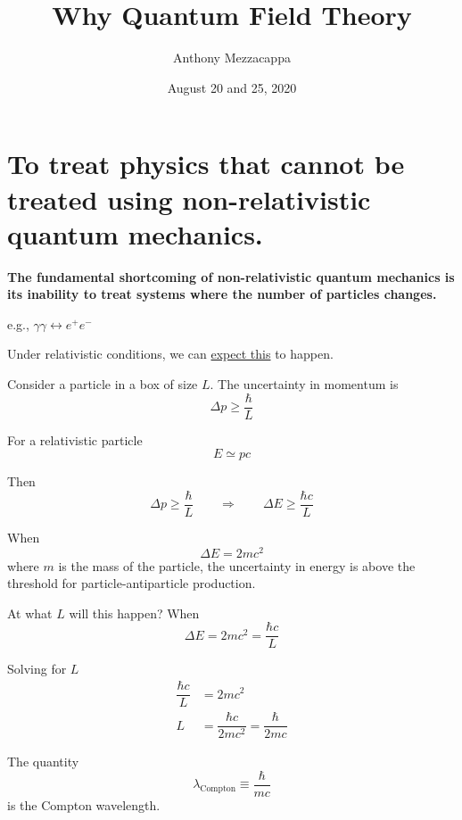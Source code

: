\documentclass{article}
\title{Why Quantum Field Theory}
\author{Anthony Mezzacappa}
\date{August 20 and 25, 2020}
\begin{document}
\setlength{\parskip}{1em}
\maketitle

\section{To treat physics that cannot be treated using non-relativistic quantum mechanics.}

\noindent \textbf{The fundamental shortcoming of non-relativistic quantum mechanics is its inability to treat systems where the number of particles changes.}

\qquad e.g., $ \gamma \gamma \leftrightarrow e^+ e^- $

\noindent Under relativistic conditions, we can \underline{expect this} to happen.

\noindent Consider a particle in a box of size $L$. The uncertainty in momentum is
\begin{equation*}
\Delta p \geq \dfrac{\hbar}{L}
\end{equation*}

\noindent For a relativistic particle
\begin{equation*}
E \simeq p c
\end{equation*}

\noindent Then
\begin{equation*}
\Delta p \geq \dfrac{\hbar}{L} \qquad \Rightarrow \qquad \Delta E \geq \dfrac{\hbar c}{L}
\end{equation*}

\noindent When
\begin{equation*}
\Delta E = 2 m c^2
\end{equation*}
where $m$ is the mass of the particle, the uncertainty in energy is above the threshold for particle-antiparticle production.


\noindent At what $L$ will this happen? When
\begin{equation*}
\Delta E = 2 m c^2 = \dfrac{\hbar c}{L}
\end{equation*}

\noindent Solving for $L$
\begin{align*}
\dfrac{\hbar c}{L} &= 2 m c ^2 \\
L &= \dfrac{\hbar c}{2 m c^2} = \dfrac{\hbar}{2mc}
\end{align*}

\noindent The quantity
\begin{equation*}
\lambda_\mathrm{Compton} \equiv \dfrac{\hbar}{mc}
\end{equation*}
is the Compton wavelength.
\end{document}
